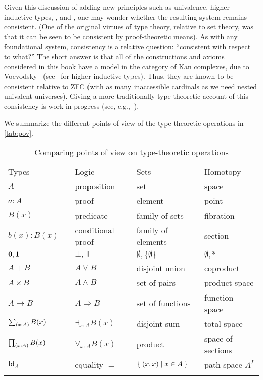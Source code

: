 Given this discussion of adding new principles such as univalence, higher inductive types, \choice{}, and \LEM{}, one may wonder whether the resulting system remains consistent.
(One of the original virtues of type theory, relative to set theory, was that it can be seen to be consistent by proof-theoretic means).
As with any foundational system, consistency is a relative question: ``consistent with respect to what?''
The short answer is that all of the constructions and axioms considered in this book have a model in the category of Kan complexes, due to Voevodsky~\citep{klv:ssetmodel} (see~\citep{ls:hits} for higher inductive types).
Thus, they are known to be consistent relative to ZFC (with as many inaccessible cardinals
%
as we need nested univalent universes).
Giving a more traditionally type-theoretic account of this consistency is work in progress (see,
e.g.,~\citep{lh:canonicity,coquand2012constructive}).

We summarize the different points of view of the type-theoretic operations in \autoref{tab:pov}.

\begin{table}[htb]
  \centering
  \OPTsmalltable
 \begin{tabular}{lllll}
    \toprule
       Types && Logic & Sets & Homotopy\\ \addlinespace[2pt]
    \midrule
       $A$ && proposition & set & space\\ \addlinespace[2pt]
       $a:A$ && proof & element & point \\ \addlinespace[2pt]
       $B(x)$ && predicate & family of sets & fibration \\ \addlinespace[2pt]
       $b(x) : B(x)$ && conditional proof & family of elements & section\\ \addlinespace[2pt]
       \(\mathbf{0}, \mathbf{1}{}\) && \(\bot, \top\) & \(\emptyset, \{ \emptyset \}\) & \(\emptyset, *\)\\ \addlinespace[2pt]
       $A + B$ && $A\vee B$ & disjoint union & coproduct\\ \addlinespace[2pt]
       $A\times B$ && $A\wedge B$ & set of pairs & product space\\ \addlinespace[2pt]
       $A\to B$ && $A\Rightarrow B$ & set of functions & function space\\ \addlinespace[2pt]
       $\sm{x:A}B(x)$ &&  $\exists_{x:A}B(x)$ & disjoint sum & total space\\ \addlinespace[2pt]
       $\prd{x:A}B(x)$ &&  $\forall_{x:A}B(x)$ & product & space of sections\\ \addlinespace[2pt]
       $\mathsf{Id}_{A}$ && equality $=$ & $\Set{{\mathopen{}(x,x)\mathclose{}} | x\in A}$ & path space $A^I$ \\ \addlinespace[2pt]
    \bottomrule
  \end{tabular}
  \caption{Comparing points of view on type-theoretic operations}\label{tab:pov}
\end{table}

